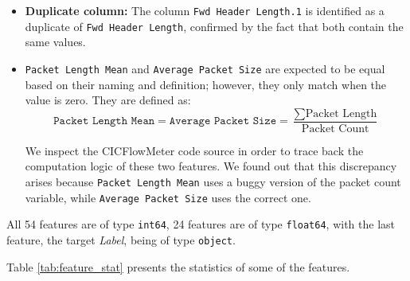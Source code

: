 \vskip0.8cm
\begin{itemize}
    \item \textbf{Duplicate column:} The column \texttt{Fwd Header Length.1} is identified as a duplicate of \texttt{Fwd Header Length}, confirmed by the fact that both contain the same values.
    \item \texttt{Packet Length Mean} and \texttt{Average Packet Size} are expected to be equal based on their naming and definition; however, they only match when the value is zero. They are defined as:
          \[
              \texttt{Packet Length Mean} =\texttt{Average Packet Size}= \frac{\sum \text{Packet Length}}{\text{Packet Count}}
          \]

          We inspect the CICFlowMeter code source in order to trace back the computation logic of these two features.
          We found out that this discrepancy arises because \texttt{Packet Length Mean} uses a buggy version of the packet count variable, while \texttt{Average Packet Size} uses the correct one.
\end{itemize}

All 54 features are of type \texttt{int64}, 24 features are of type \texttt{float64}, with the last feature, the target \emph{Label}, being of type \texttt{object}.

\vskip0.5cm
Table \ref{tab:feature_stat} presents the statistics of some of the features.

